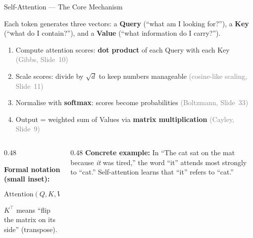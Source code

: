 \begin{frame}[shrink=8]{Self-Attention --- The Core Mechanism}

  {\small Each token generates three vectors: a \textbf{Query}
  (``what am I looking for?''), a \textbf{Key} (``what do I contain?''),
  and a \textbf{Value} (``what information do I carry?'').}

  \vspace{0.3em}

  \begin{tcolorbox}[colback=aiViolet!5,colframe=aiViolet,
    fonttitle=\bfseries,title={Self-Attention Step by Step},
    rounded corners,boxrule=0.8pt,left=4pt,right=4pt,top=4pt,bottom=4pt]
    \small
    \begin{enumerate}\setlength\itemsep{2pt}
      \item Compute attention scores: \textbf{dot product} of each Query
            with each Key \hfill\textcolor{gray}{\scriptsize(Gibbs, Slide~10)}
      \item Scale scores: divide by $\sqrt{d}$ to keep numbers
            manageable \hfill\textcolor{gray}{\scriptsize(cosine-like scaling, Slide~11)}
      \item Normalise with \textbf{softmax}: scores become
            probabilities \hfill\textcolor{gray}{\scriptsize(Boltzmann, Slide~33)}
      \item Output = weighted sum of Values via
            \textbf{matrix multiplication}
            \hfill\textcolor{gray}{\scriptsize(Cayley, Slide~9)}
    \end{enumerate}
  \end{tcolorbox}

  \vspace{0.2em}

  \begin{columns}[T]
    \begin{column}{0.48\textwidth}
      \begin{tcolorbox}[colback=gray!5,colframe=gray!40,
        boxrule=0.5pt,rounded corners,left=3pt,right=3pt,top=2pt,bottom=2pt]
        {\scriptsize\textbf{Formal notation (small inset):}
        \[
          \text{Attention}(Q,K,V)
            = \text{softmax}\!\left(\frac{Q K^{\!\top}}{\sqrt{d_k}}\right) V
        \]
        $K^{\!\top}$ means ``flip the matrix on its side'' (transpose).}
      \end{tcolorbox}
    \end{column}
    \begin{column}{0.48\textwidth}
      {\small\textbf{Concrete example:} In ``The cat sat on the mat because
      \emph{it} was tired,'' the word ``it'' attends most strongly to
      ``cat.'' Self-attention learns that ``it'' refers to ``cat.''}
    \end{column}
  \end{columns}


\end{frame}
